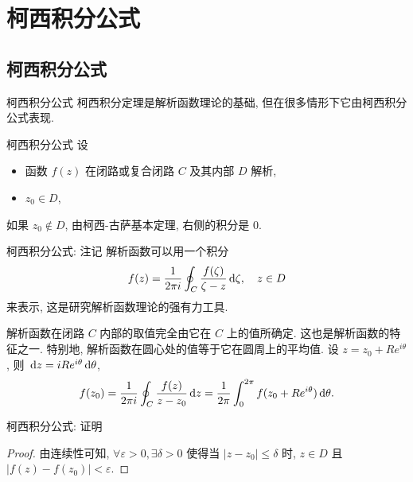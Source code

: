 \section{柯西积分公式}

\subsection{柯西积分公式}
\begin{frame}{柯西积分公式}
\onslide<+->
柯西积分定理是解析函数理论的基础, 但在很多情形下它由柯西积分公式表现.
\onslide<+->
\begin{block}{柯西积分公式}
设
\begin{itemize}[<*>]
\item 函数 $f(z)$ 在闭路或复合闭路 $C$ 及其内部 $D$ 解析,
\item $z_0\in D$,
\end{itemize}
\end{block}
\onslide<+->如果 $z_0\notin D$, 由柯西-古萨基本定理, 右侧的积分是 $0$.
\end{frame}


\begin{frame}{柯西积分公式: 注记}
\onslide<+->
解析函数可以用一个积分
\[f(z)=\frac1{2\pi i}\oint_C\frac{f(\zeta)}{\zeta-z}\,\mathrm{d}\zeta,\quad z\in D\]
来表示, 这是研究解析函数理论的强有力工具.

\onslide<+->
解析函数在闭路 $C$ 内部的取值完全由它在 $C$ 上的值所确定. 这也是解析函数的特征之一.
\onslide<+->
特别地, 解析函数在圆心处的值等于它在圆周上的平均值.
\onslide<+->
设 $z=z_0+Re^{i\theta}$, 则 $\,\mathrm{d} z=iRe^{i\theta}\,\mathrm{d}\theta$,
\onslide<+->
\[f(z_0)=\frac1{2\pi i}\oint_C\frac{f(z)}{z-z_0}\,\mathrm{d} z=\frac1{2\pi}\int_0^{2\pi}f(z_0+Re^{i\theta})\,\mathrm{d}\theta.\]
\end{frame}


\begin{frame}{柯西积分公式: 证明}
\onslide<+->
\begin{proof}
由连续性可知, $\forall\varepsilon>0,\exists\delta>0$ 使得当 $|z-z_0|\le\delta$ 时, $z\in D$ 且 $|f(z)-f(z_0)|<\varepsilon$.
\end{proof}
\end{frame}


